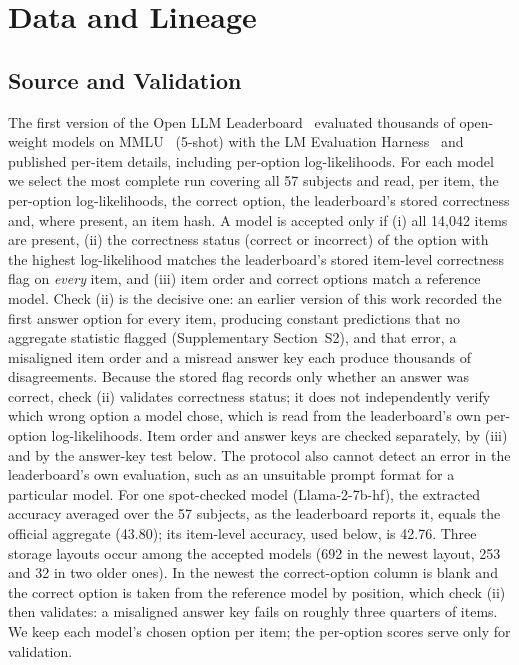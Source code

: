 \documentclass{ieeeaccess}
\theoremstyle{definition}
\theoremstyle{plain}
\begin{document}
\section{Data and Lineage}
\label{sec:data}

\subsection{Source and Validation}
The first version of the Open LLM Leaderboard~\cite{beeching2023} evaluated thousands of open-weight models on MMLU~\cite{hendrycks2021} (5-shot) with the LM Evaluation Harness~\cite{gao2021} and published per-item details, including per-option log-likelihoods. For each model we select the most complete run covering all 57 subjects and read, per item, the per-option log-likelihoods, the correct option, the leaderboard's stored correctness and, where present, an item hash. A model is accepted only if (i) all 14{,}042 items are present, (ii) the correctness status (correct or incorrect) of the option with the highest log-likelihood matches the leaderboard's stored item-level correctness flag on \emph{every} item, and (iii) item order and correct options match a reference model. Check (ii) is the decisive one: an earlier version of this work recorded the first answer option for every item, producing constant predictions that no aggregate statistic flagged (Supplementary Section~S2), and that error, a misaligned item order and a misread answer key each produce thousands of disagreements. Because the stored flag records only whether an answer was correct, check (ii) validates correctness status; it does not independently verify which wrong option a model chose, which is read from the leaderboard's own per-option log-likelihoods. Item order and answer keys are checked separately, by (iii) and by the answer-key test below. The protocol also cannot detect an error in the leaderboard's own evaluation, such as an unsuitable prompt format for a particular model. For one spot-checked model (Llama-2-7b-hf), the extracted accuracy averaged over the 57 subjects, as the leaderboard reports it, equals the official aggregate (43.80); its item-level accuracy, used below, is 42.76. Three storage layouts occur among the accepted models (692 in the newest layout, 253 and 32 in two older ones). In the newest the correct-option column is blank and the correct option is taken from the reference model by position, which check (ii) then validates: a misaligned answer key fails on roughly three quarters of items. We keep each model's chosen option per item; the per-option scores serve only for validation.
\end{document}
